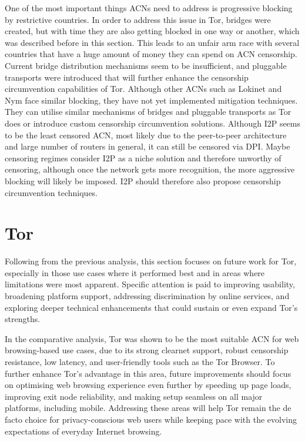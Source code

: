 One of the most important things ACNs need to address is progressive blocking by restrictive countries. In order to address this issue in Tor, bridges were created, but with time they are also getting blocked in one way or another, which was described before in this section. This leads to an unfair arm race with several countries that have a huge amount of money they can spend on ACN censorship. Current bridge distribution mechanisms seem to be insufficient, and pluggable transports were introduced that will further enhance the censorship circumvention capabilities of Tor.
Although other ACNs such as Lokinet and Nym face similar blocking, they have not yet implemented mitigation techniques. They can utilise similar mechanisms of bridges and pluggable transports as Tor does or introduce custom censorship circumvention solutions. Although I2P seems to be the least censored ACN, most likely due to the peer-to-peer architecture and large number of routers in general, it can still be censored via DPI. Maybe censoring regimes consider I2P as a niche solution and therefore unworthy of censoring, although once the network gets more recognition, the more aggressive blocking will likely be imposed. I2P should therefore also propose censorship circumvention techniques.

\section{Tor}

Following from the previous analysis, this section focuses on future work for Tor, especially in those use cases where it performed best and in areas where limitations were most apparent. Specific attention is paid to improving usability, broadening platform support, addressing discrimination by online services, and exploring deeper technical enhancements that could sustain or even expand Tor’s strengths.

In the comparative analysis, Tor was shown to be the most suitable ACN for web browsing-based use cases, due to its strong clearnet support, robust censorship resistance, low latency, and user-friendly tools such as the Tor Browser. To further enhance Tor’s advantage in this area, future improvements should focus on optimising web browsing experience even further by speeding up page loads, improving exit node reliability, and making setup seamless on all major platforms, including mobile. Addressing these areas will help Tor remain the de facto choice for privacy-conscious web users while keeping pace with the evolving expectations of everyday Internet browsing.

